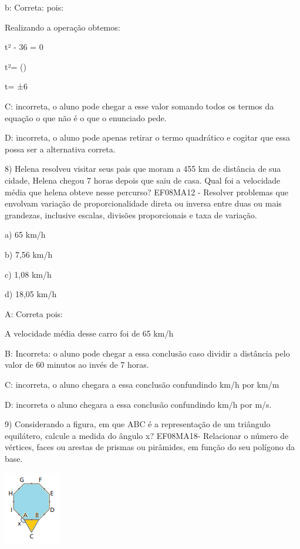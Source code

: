 b: Correta: pois:

Realizando a operação obtemos:

t² - 36 = 0

t²= ()

t= ±6

C: incorreta, o aluno pode chegar a esse valor somando todos os termos
da equação o que não é o que o enunciado pede.

D: incorreta, o aluno pode apenas retirar o termo quadrático e cogitar
que essa possa ser a alternativa correta.

8) Helena resolveu visitar seus pais que moram a 455 km de distância de
sua cidade, Helena chegou 7 horas depois que saiu de casa. Qual foi a
velocidade média que helena obteve nesse percurso? EF08MA12 - Resolver
problemas que envolvam variação de proporcionalidade direta ou inversa
entre duas ou mais grandezas, inclusive escalas, divisões proporcionais
e taxa de variação.

a) 65 km/h

b) 7,56 km/h

c) 1,08 km/h

d) 18,05 km/h

A: Correta pois:


A velocidade média desse carro foi de 65 km/h

B: Incorreta: o aluno pode chegar a essa conclusão caso dividir a
distância pelo valor de 60 minutos ao invés de 7 horas.

C: incorreta, o aluno chegara a essa conclusão confundindo km/h por km/m

D: incorreta o aluno chegara a essa conclusão confundindo km/h por m/s.

9) Considerando a figura, em que ABC é a representação de um triângulo
equilátero, calcule a medida do ângulo x? EF08MA18- Relacionar o número
de vértices, faces ou arestas de prismas ou pirâmides, em função do seu
polígono da base.

\includegraphics[width=0.98958in,height=1.26042in]{./imgSAEB_8_MAT/media/image56.png}

